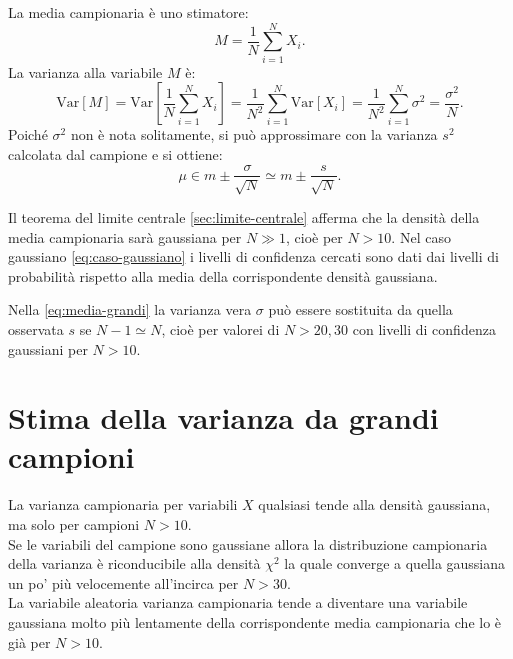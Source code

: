 La media campionaria è uno stimatore:
\begin{equation}
M=\frac { 1 }{ N } \sum _{ i=1 }^{ N }{ { X }_{ i } } .
\end{equation}
La varianza alla variabile $M$ è:
\begin{equation}
\textrm{Var}\left[ M \right] =\textrm{Var}\left[ \frac { 1 }{ N } \sum _{ i=1 }^{ N }{ { X }_{ i } }  \right] =\frac { 1 }{ N^{ 2 } } \sum _{ i=1 }^{ N }{ \textrm{Var}\left[ { X }_{ i } \right]  } =\frac { 1 }{ N^{ 2 } } \sum _{ i=1 }^{ N }{ \sigma ^{ 2 } } =\frac { \sigma ^{ 2 } }{ N } .
\end{equation}
Poiché $\sigma^2$ non è nota solitamente, si può approssimare con la varianza $s^2$ calcolata dal campione e si ottiene:
\begin{equation}
\label{eq:media-grandi}
\mu \in m \pm \frac{\sigma}{\sqrt {N}} \simeq m \pm \frac{s}{\sqrt {N}}.
\end{equation}

Il teorema del limite centrale \ref{sec:limite-centrale} afferma che la densità della media campionaria sarà gaussiana per $N\gg 1$, cioè per $N>10$. Nel caso gaussiano \ref{eq:caso-gaussiano} i livelli di confidenza cercati sono dati dai livelli di probabilità rispetto alla media della corrispondente densità gaussiana.

Nella \ref{eq:media-grandi} la varianza vera $\sigma$ può essere sostituita da quella osservata $s$ se $N-1\simeq N$, cioè per valorei di $N>20,30$ con livelli di confidenza gaussiani per $N>10$.

\section{Stima della varianza da grandi campioni} %
\label{sec:stima-var-grandi}
La varianza campionaria per variabili $X$ qualsiasi tende alla densità gaussiana, ma solo per campioni $N>10$. \\ Se le variabili del campione sono gaussiane allora la distribuzione campionaria della varianza è riconducibile alla densità $\chi^2$ la quale converge a quella gaussiana un po' più velocemente all'incirca per $N>30$. \\ La variabile aleatoria varianza campionaria tende a diventare una variabile gaussiana molto più lentamente della corrispondente media campionaria che lo è già per $N>10$.

